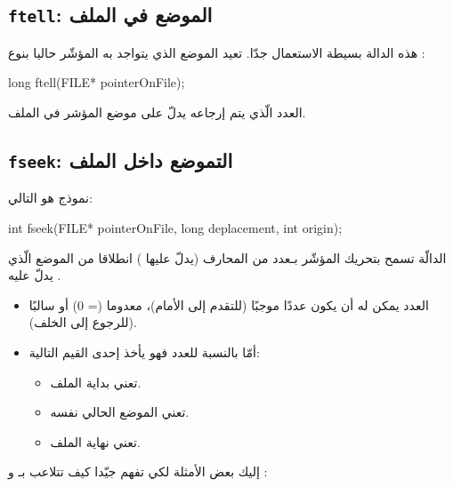 \subsection{\texttt{ftell}: الموضع في الملف}

هذه الدالة بسيطة الاستعمال جدّا. تعيد الموضع الذي يتواجد به المؤشّر حاليا بنوع
:

\begin{Csource}
long ftell(FILE* pointerOnFile);
\end{Csource}

العدد الّذي يتم إرجاعه يدلّ على موضع المؤشر في الملف.

\subsection{\texttt{fseek}: التموضع داخل الملف}

نموذج
هو التالي:

\begin{Csource}
int fseek(FILE* pointerOnFile, long deplacement, int origin);
\end{Csource}

الدالّة
تسمح بتحريك المؤشّر بـعدد من المحارف (يدلّ عليها
)
انطلاقا من الموضع الّذي يدلّ عليه
.

\begin{itemize}
  \item العدد
يمكن له أن يكون عددًا موجبًا (للتقدم إلى الأمام)، معدوما (= 0) أو سالبًا (للرجوع إلى الخلف).
  \item أمّا بالنسبة للعدد
فهو يأخذ إحدى القيم التالية:
  \begin{itemize}
    \item {}
تعني بداية الملف.
    \item {}
تعني الموضع الحالي نفسه.
    \item {}
تعني نهاية الملف.
  \end{itemize}
\end{itemize}

إليك بعض الأمثلة لكي تفهم جيّدا كيف تتلاعب بـ
و
:

